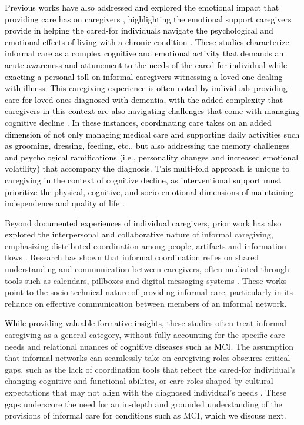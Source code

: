 \documentclass[acmsmall]{acmart}
\begin{document}
\textcolor{black}{Previous works have also addressed and explored the emotional impact that providing care has on caregivers \cite{bhat2023we, nikkhah2024family, chen2013caring}, highlighting the emotional support caregivers provide in helping the cared-for individuals navigate the psychological and emotional effects of living with a chronic condition \cite{miller2016partners}. These studies characterize informal care as a complex cognitive and emotional activity that demands an acute awareness and attunement to the needs of the cared-for individual while exacting a personal toll on informal caregivers witness\textcolor{black}{ing} a loved \textcolor{black}{one} dealing with illness.} \textcolor{black}{This caregiving experience is \textcolor{black}{often noted} by individuals providing care for loved ones diagnosed with dementia, with the added complexity that caregivers in this context are also navigating challenges that come with managing cognitive decline \cite{ducharme2011learning, zarit2008behavioral}. In these instances, coordinating care takes on an added dimension of not only managing medical care and supporting daily activities \textcolor{black}{such as} grooming, dressing, feeding, etc., but also addressing the memory challenges and psychological ramifications (i.e., personality changes and increased emotional volatility) that accompany the diagnosis. This multi-fold approach is unique to caregiving in the context of cognitive decline, as interventional support must prioritize the physical, cognitive, and socio-emotional dimensions  of maintaining independence and quality of life \cite{kim2025evaluation}.}

\textcolor{black}{Beyond documented experiences of individual caregivers, prior work has also explored the} interpersonal \textcolor{black}{and collaborative} nature of informal caregiving, emphasizing distributed coordination among people, artifacts and information flows \cite{currin2019give, tang2018awareness}. Research has shown that informal coordination relies on shared understanding and communication between caregivers, often mediated through tools such as calendars, pillboxes and digital messaging systems \cite{yamashita2018information, renyi2022uncovering}. These works point to the socio-technical nature of providing informal care, particularly in its reliance on effective communication between members of an informal network. 

\textcolor{black}{While providing valuable formative insights}, these studies often treat informal caregiving as a general category, without fully accounting for the specific care needs and relational nuances \textcolor{black}{of cognitive diseases such as MCI}. The assumption that informal networks can seamlessly take on caregiving roles \textcolor{black}{obscures} critical gaps, such as the lack of coordination tools that reflect the cared-for individual’s changing cognitive and functional abilites, or care roles shaped by cultural expectations that may not align with the diagnosed individual’s needs \cite{gutierrez2017takes}. These \textcolor{black}{gaps} underscore the need for an in-depth and grounded understanding of the provisions of informal care \textcolor{black}{for conditions such as }MCI\textcolor{black}{, which we discuss next.}
\end{document}
